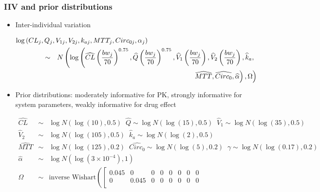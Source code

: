 \documentclass[handout]{beamer}
\begin{document}
\begin{frame}[shrink]
  \frametitle{IIV and prior distributions}

  \begin{itemize}
  \footnotesize
\item Inter-individual variation
  \begin{scriptsize}
    \begin{eqnarray*}
      \lefteqn{\log\left(CL_j,Q_j,V_{1j},V_{2j},k_{aj},MTT_j,Circ_{0j},\alpha_j\right)}\ \ \ \ \ \ \ \ \ \ \ \  \\
      &\sim& N\left(\log\left(\widehat{CL}\left(\frac{bw_j}{70}\right)^{0.75},\widehat{Q}\left(\frac{bw_j}{70}\right)^{0.75},
          \widehat{V}_1\left(\frac{bw_j}{70}\right),\widehat{V}_2\left(\frac{bw_j}{70}\right),\widehat{k}_a,\right.\right.
             \\
    & & \left. \left.\widehat{MTT}, \widehat{Circ_0}, \widehat{\alpha}\right),\Omega\right)
    \end{eqnarray*}
  \end{scriptsize}
\item Prior distributions: moderately informative for PK, strongly
  informative for system parameters, weakly informative for drug effect
  \begin{scriptsize}
    \begin{eqnarray*}
      \widehat{CL} &\sim&  \log N\left(\log(10),
                                           0.5\right) \;\;
                                           \widehat{Q}
                                           \sim  \log N\left(\log(15),
                                           0.5\right) \;\;
      \widehat{V}_1 \sim  \log N\left(\log(35), 0.5\right) \\
      \widehat{V}_2 &\sim&  \log N\left(\log(105), 0.5\right) \;\;
      \widehat{k}_a \sim
                                            \log N\left(\log(2),
                           0.5\right) \\
      \widehat{MTT} &\sim& \log N\left(\log(125), 0.2\right) \;\; 
      \widehat{Circ_0} \sim \log N\left(\log(5), 0.2\right) \;\;
      \gamma \sim \log N\left(\log(0.17), 0.2\right) \\
      \widehat{\alpha} &\sim& \log N\left(\log(3\times 10^{-4}), 1\right) \\
     \Omega &\sim& \text{inverse Wishart}\left(\left[\begin{array}{cccccccc}
                 0.045 & 0 & 0 & 0 & 0 & 0 & 0 & 0  \\
                 0 & 0.045 & 0 & 0 & 0 & 0 & 0 & 0 \\  

\end{array}
\end{eqnarray*}
\end{scriptsize}
\end{itemize}
\end{frame}
\end{document}
